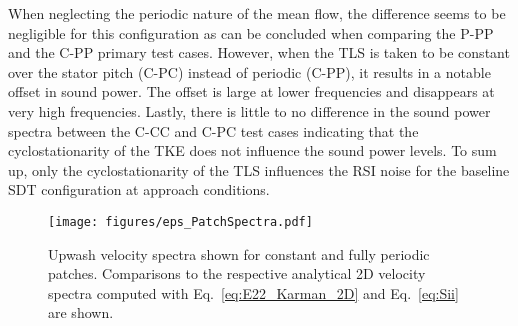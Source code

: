 When neglecting the periodic nature of the mean flow, the difference seems to be negligible for this configuration as can be concluded when comparing the P-PP and the C-PP primary test cases.  However, when the TLS is taken to be constant over the stator pitch (C-PC) instead of periodic (C-PP), it results in a notable offset in sound power. The offset is large at lower frequencies and disappears at very high frequencies.  Lastly, there is little to no difference in the sound power spectra between the C-CC and C-PC test cases indicating that the cyclostationarity of the TKE does not influence the sound power levels.  To sum up, only the cyclostationarity of the TLS influences the RSI noise for the baseline SDT configuration at approach conditions.

\begin{figure}
\centering
\texttt{[image: figures/eps\_PatchSpectra.pdf]} 
\caption{Upwash velocity spectra shown for constant and fully periodic patches.  Comparisons to the respective analytical 2D velocity spectra computed with Eq.~\ref{eq:E22_Karman_2D} and Eq.~\ref{eq:Sii} are shown. \label{fig:PatchSpectra} }
\end{figure}
